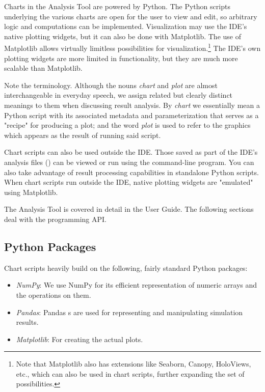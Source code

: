Charts in the Analysis Tool are powered by Python. The Python scripts underlying
the various charts are open for the user to view and edit, so arbitrary logic
and computations can be implemented. Visualization may use the IDE's native
plotting widgets, but it can also be done with Matplotlib. The use of Matplotlib
allows virtually limitless possibilities for visualization.\footnote{Note that
Matplotlib also has extensions like Seaborn, Canopy, HoloViews, etc., which can
also be used in chart scripts, further expanding the set of possibilities.} The IDE's
own plotting widgets are more limited in functionality, but they are much more
scalable than Matplotlib.

\begin{note}
Note the terminology. Although the nouns \textit{chart} and \textit{plot} are
almost interchangeable in everyday speech, we assign related but clearly
distinct meanings to them when discussing {\opp} result analysis. By
\textit{chart} we essentially mean a Python script with its associated metadata
and parameterization that serves as a "recipe" for producing a plot; and the
word \textit{plot} is used to refer to the graphics which appears as the result
of running said script.
\end{note}

Chart scripts can also be used outside the IDE. Those saved as part of the IDE's
analysis files () can be viewed or run using the 
command-line program. You can also take advantage of result processing
capabilities in standalone Python scripts. When chart scripts run outside the IDE,
native plotting widgets are "emulated" using Matplotlib.

The Analysis Tool is covered in detail in the User Guide. The following sections
deal with the programming API.


\subsection{Python Packages}

Chart scripts heavily build on the following, fairly standard Python packages:

\begin{itemize}
  \item \textit{NumPy}: We use NumPy for its efficient representation of numeric
    arrays and the operations on them.
  \item \textit{Pandas}: Pandas s are used for representing and
    manipulating simulation results.
  \item \textit{Matplotlib}: For creating the actual plots.
\end{itemize}

